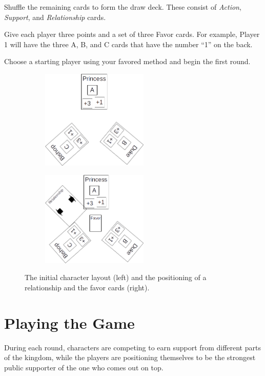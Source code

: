 \documentclass{article}
\begin{document}
Shuffle the remaining cards to form the draw deck. These consist of
\textit{Action}, \textit{Support}, and \textit{Relationship} cards.

Give each player three points and a set of three Favor cards. For example,
Player 1 will have the three A, B, and C cards that have the number ``1''
on the back.

Choose a starting player using your favored method and begin the first round.

\begin{figure}
  \centering
  \begin{subfigure}{0.5\textwidth}
    \centering
    \includegraphics[width=2in]{layout_initial}
  \end{subfigure}%
  \begin{subfigure}{0.5\textwidth}
    \centering
    \includegraphics[width=2in]{layout_after}
  \end{subfigure}
  \caption{The initial character layout (left) and the positioning
     of a relationship and the favor cards (right).}
\end{figure}


\section*{Playing the Game}

During each round, characters are competing to earn support from
different parts of the kingdom, while the players are positioning
themselves to be the strongest public supporter of the one who comes
out on top.
\end{document}

